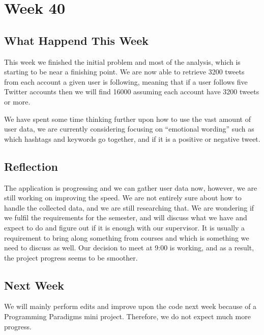 \section*{Week 40}
\subsection*{What Happend This Week}
This week we finished the initial problem and most of the analysis, which is
starting to be near a finishing point. We are now able to retrieve 3200 tweets
from each account a given user is following, meaning that if a user follows five
Twitter accounts then we will find 16000 assuming each account have 3200 tweets
or more.

We have spent some time thinking further upon how to use the vast amount of user
data, we are currently considering focusing on ``emotional wording'' such as
which hashtags and keywords go together, and if it is a positive or negative
tweet.

\subsection*{Reflection}
The application is progressing and we can gather user data now, however, we are
still working on improving the speed. We are not entirely sure about how to
handle the collected data, and we are still researching that. We are wondering
if we fulfil the requirements for the semester, and will discuss what we have
and expect to do and figure out if it is enough with our supervisor. It is
usually a requirement to bring along something from courses and which is
something we need to discuss as well. Our decision to meet at 9:00 is working,
and as a result, the project progress seems to be smoother.

\subsection*{Next Week} 
We will mainly perform edits and improve upon the code
next week because of a Programming Paradigms mini project. Therefore, we do not
expect much more progress.




